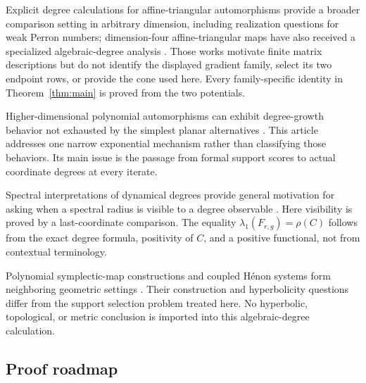 \documentclass[11pt]{article}
\theoremstyle{remark}
\numberwithin{equation}{section}
\begin{document}
Explicit degree calculations for affine-triangular automorphisms provide a
broader comparison setting in arbitrary dimension, including realization
questions for weak Perron numbers; dimension-four affine-triangular maps have
also received a specialized algebraic-degree analysis
\citep{BlancVanSanten2021,ShaoSun2025}.  Those works motivate finite matrix
descriptions but do not identify the displayed gradient family, select its
two endpoint rows, or provide the cone used here.  Every family-specific
identity in Theorem~\ref{thm:main} is proved from the two potentials.

Higher-dimensional polynomial automorphisms can exhibit degree-growth
behavior not exhausted by the simplest planar alternatives
\citep{Deserti2016}.  This article addresses one narrow exponential
mechanism rather than classifying those behaviors.  Its main issue is the
passage from formal support scores to actual coordinate degrees at every
iterate.

Spectral interpretations of dynamical degrees provide general motivation for
asking when a spectral radius is visible to a degree observable
\citep{DangFavre2021}.  Here visibility is proved by a last-coordinate
comparison.  The equality \(\lambda_1(F_{r,g})=\rho(C)\) follows from the
exact degree formula, positivity of \(C\), and a positive functional, not
from contextual terminology.

Polynomial symplectic-map constructions and coupled H\'enon systems form
neighboring geometric settings \citep{Rangarajan2002,FujiokaKogawaLiShudo2023}.
Their construction and hyperbolicity questions differ from the support
selection problem treated here.  No hyperbolic, topological, or metric
conclusion is imported into this algebraic-degree calculation.

\subsection*{Proof roadmap}
\end{document}
